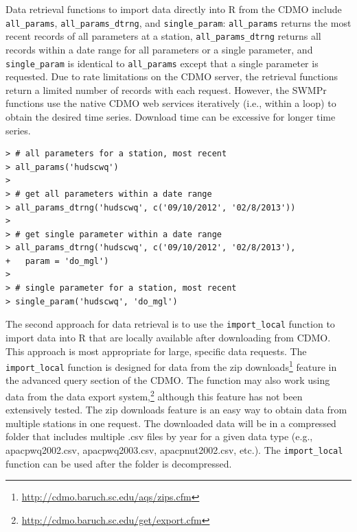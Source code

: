 \documentclass[10pt,letterpaper]{article}\usepackage[]{graphicx}\usepackage[]{color}
\makeatletter
\newenvironment{kframe}{%
 \def\at@end@of@kframe{}%
 \ifinner\ifhmode%
  \def\at@end@of@kframe{\end{minipage}}%
  \begin{minipage}{\columnwidth}%
 \fi\fi%
 \def\FrameCommand##1{\hskip\@totalleftmargin \hskip-\fboxsep
 \colorbox{shadecolor}{##1}\hskip-\fboxsep
     \hskip-\linewidth \hskip-\@totalleftmargin \hskip\columnwidth}%
 \MakeFramed {\advance\hsize-\width
   \@totalleftmargin\z@ \linewidth\hsize
   \@setminipage}}%
 {\par\unskip\endMakeFramed%
 \at@end@of@kframe}
\newenvironment{knitrout}{}{} %
\makeatother
\begin{document}
Data retrieval functions to import data directly into R from the \ac{CDMO} include \texttt{all\_params}, \texttt{all\_params\_dtrng}, and \texttt{single\_param}: \texttt{all\_params} returns the most recent records of all parameters at a station, \texttt{all\_params\_dtrng} returns all records within a date range for all parameters or a single parameter, and \texttt{single\_param} is identical to \texttt{all\_params} except that a single parameter is requested. Due to rate limitations on the \ac{CDMO} server, the retrieval functions return a limited number of records with each request.  However, the SWMPr functions use the native CDMO web services iteratively (i.e., within a loop) to obtain the desired time series.  Download time can be excessive for longer time series.     

\begin{knitrout}\small
{}\color{fgcolor}\begin{kframe}
\begin{verbatim}
> # all parameters for a station, most recent
> all_params('hudscwq')
> 
> # get all parameters within a date range
> all_params_dtrng('hudscwq', c('09/10/2012', '02/8/2013'))
> 
> # get single parameter within a date range
> all_params_dtrng('hudscwq', c('09/10/2012', '02/8/2013'), 
+   param = 'do_mgl')
> 
> # single parameter for a station, most recent
> single_param('hudscwq', 'do_mgl')
\end{verbatim}
\end{kframe}
\end{knitrout}

The second approach for data retrieval is to use the \texttt{import\_local} function to import data into R that are locally available after downloading from \ac{CDMO}.  This approach is most appropriate for large, specific data requests. The \texttt{import\_local} function is designed for data from the zip downloads\footnote{\url{http://cdmo.baruch.sc.edu/aqs/zips.cfm}} feature in the advanced query section of the \ac{CDMO}. The function may also work using data from the data export system,\footnote{\url{http://cdmo.baruch.sc.edu/get/export.cfm}} although this feature has not been extensively tested.  The zip downloads feature is an easy way to obtain data from multiple stations in one request.  The downloaded data will be in a compressed folder that includes multiple .csv files by year for a given data type (e.g., apacpwq2002.csv, apacpwq2003.csv, apacpnut2002.csv, etc.).  The \texttt{import\_local} function can be used after the folder is decompressed.
\end{document}
